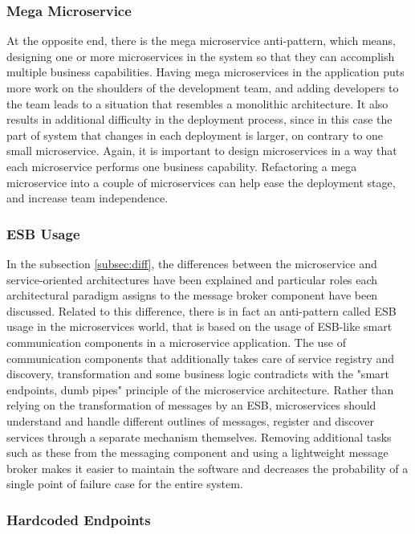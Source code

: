\documentclass{Configuration_Files/PoliMi3i_thesis}
\begin{document}
\subsubsection{Mega Microservice}
\label{subsubsec:mega_microservice}

At the opposite end, there is the mega microservice anti-pattern, which means, designing one or more microservices in the system so that they can accomplish multiple business capabilities.
Having mega microservices in the application puts more work on the shoulders of the development team, and adding developers to the team leads to a situation that resembles a monolithic architecture.
It also results in additional difficulty in the deployment process, since in this case the part of system that changes in each deployment is larger, on contrary to one small microservice.
Again, it is important to design microservices in a way that each microservice performs one business capability.
Refactoring a mega microservice into a couple of microservices can help ease the deployment stage, and increase team independence.

\subsubsection{ESB Usage}
\label{subsubsec:esb_usage}

In the subsection \ref{subsec:diff}, the differences between the microservice and service-oriented architectures have been explained and particular roles each architectural paradigm assigns to the message broker component have been discussed.
Related to this difference, there is in fact an anti-pattern called ESB usage in the microservices world, that is based on the usage of ESB-like smart communication components in a microservice application.
The use of communication components that additionally takes care of service registry and discovery, transformation and some business logic contradicts with the "smart endpoints, dumb pipes" principle of the microservice architecture.
Rather than relying on the transformation of messages by an ESB, microservices should understand and handle different outlines of messages, register and discover services through a separate mechanism themselves.
Removing additional tasks such as these from the messaging component and using a lightweight message broker makes it easier to maintain the software and decreases the probability of a single point of failure case for the entire system.

\subsubsection{Hardcoded Endpoints}
\label{subsubsec:hardcoded_endpoints}
\end{document}
